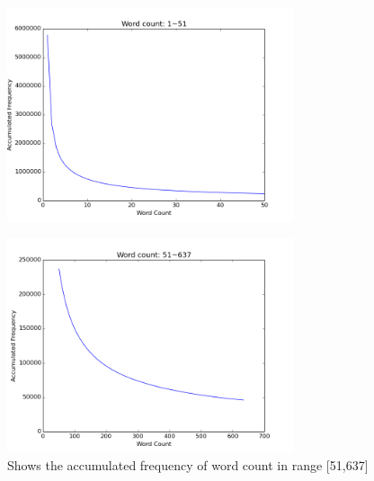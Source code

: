 \begin{figure}[H]
\centering
    \includegraphics[width=0.75\textwidth]{1to51} 
	\caption{Shows the accumulated frequency of word count in range [1,51]}
	\label{fig:1to51}
\begin{figure}[H]
\centering
  \end{figure}
        \includegraphics[width=0.75\textwidth]{51to637} 
	\caption{Shows the accumulated frequency of word count in range [51,637]}
	\label{fig:51to637}
\end{figure}


